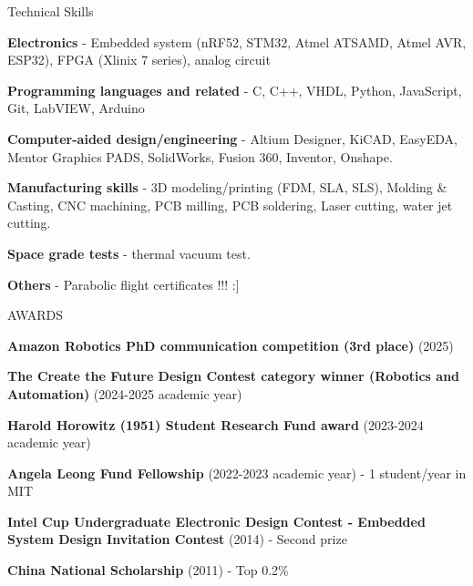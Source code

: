 \documentclass{resume} %
\begin{document}

\begin{rSection}{Technical Skills}

\begin{itemlabel}

\item \textbf{Electronics} - Embedded system (nRF52, STM32, Atmel ATSAMD, Atmel AVR, ESP32), FPGA (Xlinix 7 series), analog circuit
\item \textbf{Programming languages and related} - C, C++, VHDL, Python, JavaScript, Git, LabVIEW, Arduino
\item \textbf{Computer-aided design/engineering} - Altium Designer, KiCAD, EasyEDA, Mentor Graphics PADS, SolidWorks, Fusion 360, Inventor, Onshape.
\item \textbf{Manufacturing skills} - 3D modeling/printing (FDM, SLA, SLS), Molding \& Casting, CNC machining, PCB milling, PCB soldering, Laser cutting, water jet cutting.
\item \textbf{Space grade tests} - thermal vacuum test.
\item \textbf{Others} - Parabolic flight certificates !!! :]
\end{itemlabel}
\end{rSection}

\begin{rSection}{AWARDS}
\begin{itemlabel}
\item \textbf{Amazon Robotics PhD communication competition (3rd place)} (2025)
\smallskip
\smallskip

\item \textbf{The Create the Future Design Contest category winner (Robotics and Automation)} (2024-2025 academic year)
\smallskip
\smallskip

\begin{itemlabel}
\item \textbf{Harold Horowitz (1951) Student Research Fund award} (2023-2024 academic year)
\smallskip
\smallskip

\item \textbf{Angela Leong Fund Fellowship} (2022-2023 academic year) - 1 student/year in MIT
\smallskip
\smallskip

\item \textbf{Intel Cup Undergraduate Electronic Design Contest - Embedded System Design Invitation Contest} (2014) - Second prize
\smallskip
\smallskip

\item \textbf{China National Scholarship} (2011) - Top 0.2\%
\smallskip
\smallskip

\end{itemlabel}
\end{itemlabel}
\end{rSection}
\end{document}
